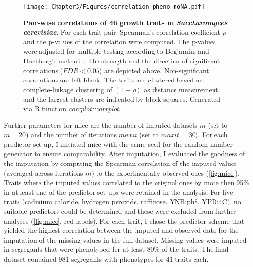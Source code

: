 \begin{figure}[hbtp]
	\centering
	\texttt{[image: Chapter3/Figures/correlation\_pheno\_noNA.pdf]}
	\caption[\textbf{Pairwise correlations of \num{46} growth traits in \emph{Saccharomyces cerevisiae}.}]{\textbf{Pair-wise correlations of \num{46} growth traits in \emph{Saccharomyces cerevisiae}.} For each trait pair, Spearman's correlation coefficient \(\rho\) and the p-values of the correlation were computed. The p-values were adjusted for multiple testing according to Benjamini and Hochberg's method \citep{Benjamini1995}. The strength and the direction of significant correlations (\(FDR < 0.05\)) are depicted above. Non-significant correlations are left blank. The traits are clustered based on complete-linkage clustering of \((1-\rho)\) as distance measurement and the largest clusters are indicated by black squares. Generated via R function \textit{corrplot::corrplot}.}
 	\label{fig:traitcorrelations}
\end{figure}


Further parameters for \gls{mice} are the number of imputed datasets \(m\) (set to \(m=20\)) and the number of iterations \(maxit\) (set to \(maxit=30\)). For each predictor set-up, I initiated \gls{mice} with the same seed for the random number generator to ensure comparability. After imputation, I evaluated the goodness of the imputation  by computing the Spearman correlation of the imputed values (averaged across iterations \(m\)) to the experimentally observed ones (\cref{fig:mice}). Traits where the imputed values correlated to the original ones by more then \num{95}\% in at least one of the predictor set-ups were retained in the analysis. For five traits (cadmium chloride, hydrogen peroxide, raffinose, YNB:ph8, YPD:4C), no suitable predictors could be determined and these were excluded from further analyses (\cref{fig:mice}, red labels). For each trait, I chose the predictor scheme that yielded the highest correlation between the imputed and observed data for the imputation of the missing values in the full dataset. Missing values were imputed in segregants that were phenotyped for at least \num{80}\% of the traits. The final dataset contained \num{981} segregants with phenotypes for \num{41} traits each. 
 	
